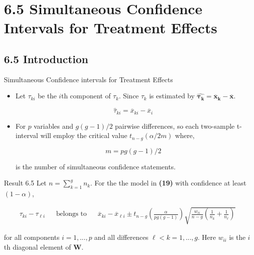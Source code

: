 \documentclass[8pt]{beamer}
\begin{document}
\section{6.5 Simultaneous Confidence Intervals for Treatment Effects}

\subsection{6.5 Introduction}
    \begin{frame}{Simultaneous Confidence intervals for Treatment Effects} %
        \begin{itemize}
            \item Let $\tau_{ki}$ be the $i$th component of $\tau_{k}$. Since $\tau_{k}$ is estimated by $\hat{\mathbf{\tau_{k}}} = \mathbf{\overline{x}_{k} - \overline{x}}$. 
            
            \begin{equation}
                \hat{\tau}_{ki} = \overline{x}_{ki} - \overline{x}_{i}
            \end{equation}
            
            \item For $p$ variables and $g(g-1)/2$ pairwise differences, so each two-sample t-interval will employ the critical value $t_{n-g}(\alpha/2m)$ where, 
            
            \begin{equation}
                m = pg(g - 1)/2
            \end{equation}
            
            is the number of simultaneous confidence statements. 
            
        \end{itemize}
        
        \begin{block}{Result 6.5}
            Let $n = \sum_{k=1}^{g}n_{k}$. For the the model in \textbf{(19)} with confidence at least $(1 - \alpha)$, 
            
            \begin{align*}
                \tau_{ki} - \tau_{\ell i} && \text{belongs to} && \overline{x}_{ki} - \overline{x}_{\ell i} \pm t_{n - g}\left(\frac{\alpha}{pg(g - 1)}\right)\sqrt{\frac{w_{ii}}{n - g}\left(\frac{1}{n_{k}} + \frac{1}{n_{\ell}}\right)}
            \end{align*}
            
            for all components $i = 1,...,p$ and all differences $\ell < k = 1,...,g$. Here $w_{ii}$ is the $i$th diagonal element of $\mathbf{W}$. 
        \end{block}
        
        
    \end{frame}
\end{document}
